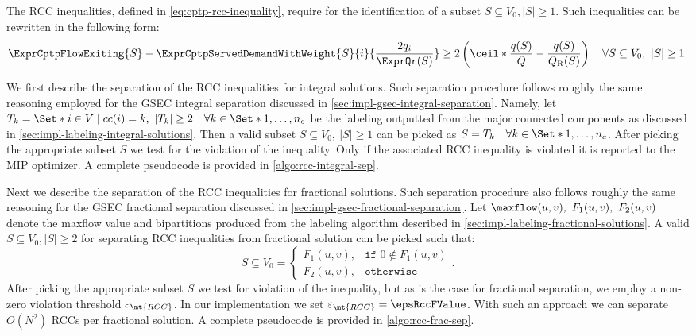 The RCC inequalities, defined in \cref{eq:cptp-rcc-inequality},
require for the identification of a subset $S \subseteq V_0, |S| \ge 1$.
Such inequalities can be rewritten in the following form:
\begin{equation}
	\ExprCptpFlowExiting{S} - \ExprCptpServedDemandWithWeight{S}{i}{\frac{2 q_i}{\ExprQr(S)}}    \ge   2 \left( \ceil*{ \frac{q(S)}{Q}} - \frac{q(S)}{Q_{\mathrm{R}}(S)} \right) \quad \forall S \subseteq V_0,\ |S| \ge 1.
\end{equation}

We first describe the separation of the RCC inequalities for integral solutions.
Such separation procedure follows roughly the same reasoning
employed for the GSEC integral separation discussed in \cref{sec:impl-gsec-integral-separation}.
Namely, let $T_k  = \Set*{i \in V \mid cc(i) = k},\ |T_k| \ge 2 \quad \forall k \in \Set*{1, \dots, n_c}$ be the labeling
outputted from the major connected components as discussed in \cref{sec:impl-labeling-integral-solutions}.
Then a valid subset $S \subseteq V_0,\ |S| \ge 1$ can be picked as $S = T_k \quad \forall k \in \Set*{1, \dots, n_c}$.
After picking the appropriate subset $S$ we test for the violation of the inequality.
Only if the associated RCC inequality is violated it is reported to the MIP optimizer.
A complete pseudocode is provided in \cref{algo:rcc-integral-sep}.

Next we describe the separation of the RCC inequalities for fractional solutions.
Such separation procedure also follows roughly the same reasoning
for the GSEC fractional separation discussed in \cref{sec:impl-gsec-fractional-separation}.
Let $\maxflow(u, v),\ F_1(u, v),\ F_2(u, v)$ denote the maxflow value and bipartitions
produced from the labeling algorithm described in \cref{sec:impl-labeling-fractional-solutions}.
A valid $S \subseteq V_0, |S| \ge 2$ for separating RCC inequalities
from fractional solution can be picked such that:
\begin{equation}
	S \subseteq V_0 =
	\begin{cases}
		F_1(u, v), & \texttt{if } 0 \notin F_1(u, v) \\
		F_2(u, v), & \texttt{otherwise}
	\end{cases}.
\end{equation}
After picking the appropriate subset $S$ we test for violation of the inequality,
but as is the case for fractional separation,
we employ a non-zero violation threshold $\varepsilon_{\mt{RCC}}$.
In our implementation we set $\varepsilon_{\mt{RCC}} = \epsRccFValue$.
With such an approach we can separate $O(N^2)$ RCCs per fractional solution.
A complete pseudocode is provided in \cref{algo:rcc-frac-sep}.

